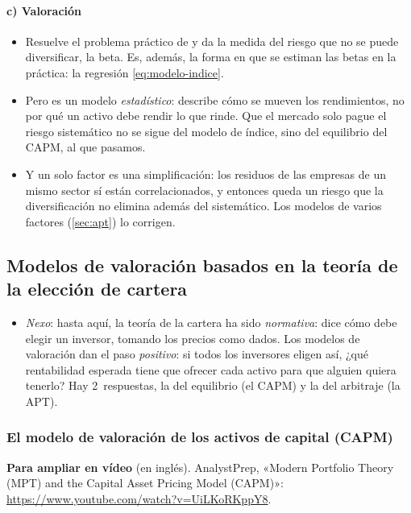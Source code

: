 \documentclass[11pt]{article}
\begin{document}
\paragraph{c) Valoración}

\begin{itemize}
\item Resuelve el problema práctico de  y da la medida del riesgo que no se puede diversificar, la beta. Es, además, la forma en que se estiman las betas en la práctica: la regresión \eqref{eq:modelo-indice}.
\item Pero es un modelo \emph{estadístico}: describe cómo se mueven los rendimientos, no por qué un activo debe rendir lo que rinde. Que el mercado solo pague el riesgo sistemático no se sigue del modelo de índice, sino del equilibrio del CAPM, al que pasamos.
\item Y un solo factor es una simplificación: los residuos de las empresas de un mismo sector sí están correlacionados, y entonces queda un riesgo que la diversificación no elimina además del sistemático. Los modelos de varios factores (\ref{sec:apt}) lo corrigen.
\end{itemize}

\subsection{Modelos de valoración basados en la teoría de la elección de cartera}\label{sec:valoracion}

\begin{itemize}
\item \emph{Nexo}: hasta aquí, la teoría de la cartera ha sido \emph{normativa}: dice cómo debe elegir un inversor, tomando los precios como dados. Los modelos de valoración dan el paso \emph{positivo}: si todos los inversores eligen así, ¿qué rentabilidad esperada tiene que ofrecer cada activo para que alguien quiera tenerlo? Hay 2~respuestas, la del equilibrio (el CAPM) y la del arbitraje (la APT).
\end{itemize}

\subsubsection{El modelo de valoración de los activos de capital (CAPM)}\label{sec:capm}

\begin{anotaciones}
\textbf{Para ampliar en vídeo} (en inglés). AnalystPrep, «Modern Portfolio Theory (MPT) and the Capital Asset Pricing Model (CAPM)»: \url{https://www.youtube.com/watch?v=UiLKoRKppY8}.
\end{anotaciones}
\end{document}
